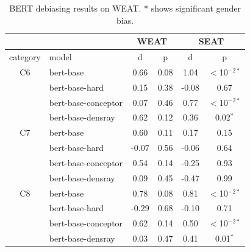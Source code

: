 \begin{table}[h]
	\centering
	\footnotesize
	\begin{tabular}{clcccc}
		\hline
		&&\multicolumn{2}{c}{WEAT}&\multicolumn{2}{c}{SEAT}\\
		\hline
		category & model & d & p& d & p\\
		\hline
		C6 & bert-base & 0.66 & 0.08 &1.04&$<$10$^{-2*}$\\
		& bert-base-hard & 0.15 & 0.38&{-0.08}&0.67\\
		& bert-base-conceptor & {0.07} & 0.46&0.77&$<$10$^{-2*}$\\
		&bert-base-densray & 0.62 & 0.12&0.36&0.02$^{*}$\\
		\hline
		C7 & bert-base & 0.60 & 0.11 &0.17&0.15\\
		& bert-base-hard & {-0.07} & 0.56&{-0.06}&0.64\\
		& bert-base-conceptor & 0.54 & 0.14&-0.25&0.93\\
		& bert-base-densray & 0.09 & 0.45&-0.47&0.99\\
		\hline
		C8& bert-base & 0.78 & 0.08 &0.81&$<$10$^{-2*}$\\
		& bert-base-hard & -0.29 & 0.68&{-0.10}&0.71\\
		& bert-base-conceptor & 0.62 & 0.14&0.50&$<$10$^{-2*}$\\
		& bert-base-densray & {0.03} & 0.47&0.41&0.01$^{*}$\\
		\hline
	\end{tabular}
	\caption{
		BERT debiasing results on WEAT. * shows significant gender bias.}
\end{table}

